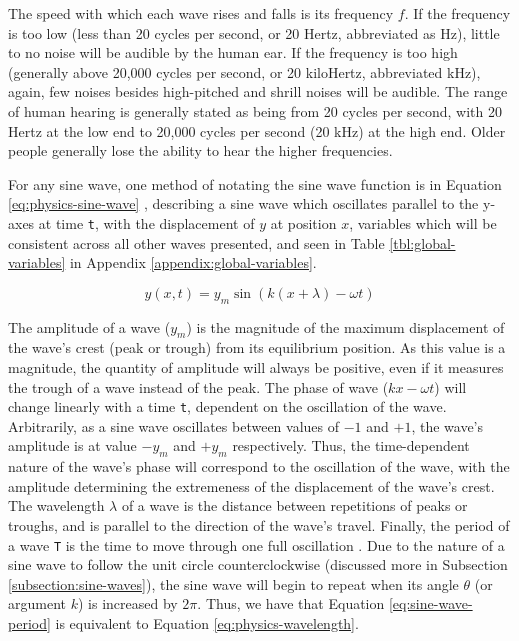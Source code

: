 The speed with which each wave rises and falls is its frequency $f$. If the frequency is too low (less than 20 cycles per second, or 20 Hertz, abbreviated as Hz), little to no noise will be audible by the human ear. If the frequency is too high (generally above 20,000 cycles per second, or 20 kiloHertz, abbreviated kHz), again, few noises besides high-pitched and shrill noises will be audible. The range of human hearing is generally stated as being from 20 cycles per second, with 20 Hertz at the low end to 20,000 cycles per second (20 kHz) at the high end. Older people generally lose the ability to hear the higher frequencies.

For any sine wave, one method of notating the sine wave function is in Equation \ref{eq:physics-sine-wave} \cite{Halliday_Resnick_Walker_2005}, describing a sine wave which oscillates parallel to the y-axes at time \texttt{t}, with the displacement of $y$ at position $x$, variables which will be consistent across all other waves presented, and seen in Table \ref{tbl:global-variables} in Appendix \ref{appendix:global-variables}.

\begin{equation}
	y(x,t) = y_m \sin(k(x + \lambda) - \omega t)
	\label{eq:physics-sine-wave}
\end{equation}

The amplitude of a wave ($y_m$) is the magnitude of the maximum displacement of the wave's crest (peak or trough) from its equilibrium position. As this value is a magnitude, the quantity of amplitude will always be positive, even if it measures the trough of a wave instead of the peak. The phase of wave ($kx - \omega t$) will change linearly with a time \texttt{t}, dependent on the oscillation of the wave. Arbitrarily, as a sine wave oscillates between values of $-1$ and $+1$, the wave's amplitude is at value $-y_m$ and $+y_m$ respectively. Thus, the time-dependent nature of the wave's phase will correspond to the oscillation of the wave, with the amplitude determining the extremeness of the displacement of the wave's crest. The wavelength $\lambda$ of a wave is the distance between repetitions of peaks or troughs, and is parallel to the direction of the wave's travel. Finally, the period of a wave \texttt{T} is the time to move through one full oscillation \cite{Halliday_Resnick_Walker_2005}. Due to the nature of a sine wave to follow the unit circle counterclockwise (discussed more in Subsection \ref{subsection:sine-waves}), the sine wave will begin to repeat when its angle $\theta$ (or argument $k$) is increased by $2\pi$. Thus, we have that Equation \ref{eq:sine-wave-period} is equivalent to Equation \ref{eq:physics-wavelength}.

